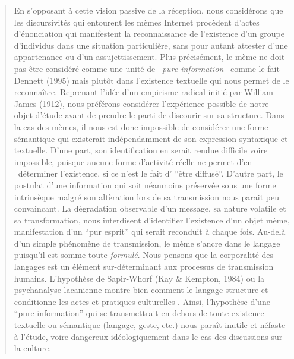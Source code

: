 \begin{quote}
En s{\textquoteright}opposant \`a cette vision passive de la r\'eception, nous consid\'erons que les discursivit\'es qui entourent les m\`emes Internet proc\`edent d{\textquoteright}actes d{\textquoteright}\'enonciation qui manifestent la reconnaissance de l{\textquoteright}existence d{\textquoteright}un groupe d{\textquoteright}individus dans une situation particuli\`ere, sans pour autant attester d{\textquoteright}une appartenance ou d{\textquoteright}un assujettissement. Plus pr\'ecis\'ement, le m\`eme ne doit pas \^etre consid\'er\'e comme une unit\'e de {\guillemotleft}~\textit{pure information~{\guillemotright}} comme le fait Dennett (1995) mais plut\^ot dans l{\textquoteright}existence textuelle qui nous permet de le reconna\^itre. Reprenant l{\textquoteright}id\'ee d{\textquoteright}un empirisme radical initi\'e par William James (1912), nous pr\'ef\'erons consid\'erer l'exp\'erience possible de notre objet d{\textquoteright}\'etude avant de prendre le parti de discourir sur sa structure. Dans la cas des m\`emes, il nous est donc impossible de consid\'erer une forme s\'emantique qui existerait ind\'ependamment de son expression syntaxique et textuelle. D{\textquoteright}une part, son identification en serait rendue difficile voire impossible, puisque aucune forme d{\textquoteright}activit\'e r\'eelle ne permet d{\textquoteright}en \ d\'eterminer l{\textquoteright}existence, si ce n{\textquoteright}est le fait d{\textquoteright} {\textquotedblright}\^etre diffus\'e{\textquotedblright}. D{\textquoteright}autre part, le postulat d{\textquoteright}une information qui soit n\'eanmoins pr\'eserv\'ee sous une forme intrins\`eque malgr\'e son alt\`eration lors de sa transmission nous parait peu convaincant. La d\'egradation observable d{\textquoteright}un message, sa nature volatile et sa transformation, nous interdisent d{\textquoteright}identifier l{\textquoteright}existence d{\textquoteright}un objet m\`eme, manifestation d{\textquoteright}un {\textquotedblleft}pur esprit{\textquotedblright} qui serait reconduit \`a chaque fois. Au-del\`a d{\textquoteright}un simple ph\'enom\`ene de transmission, le m\`eme s{\textquoteright}ancre dans le langage puisqu{\textquoteright}il est somme toute \textit{formul\'e}. Nous pensons que la corporalit\'e des langages est un \'el\'ement sur-d\'eterminant aux processus de transmission humains. L{\textquoteright}hypoth\`ese de Sapir-Whorf (Kay \& Kempton, 1984) ou la psychanalyse lacanienne montre bien comment le langage structure et conditionne les actes et pratiques culturelles \cite{Lacan1966}. Ainsi, l{\textquoteright}hypoth\`ese d{\textquoteright}une {\textquotedblleft}pure information{\textquotedblright} qui se transmettrait en dehors de toute existence textuelle ou s\'emantique (langage, geste, etc.) nous para\^it inutile et n\'efaste \`a l{\textquoteright}\'etude, voire dangereux id\'eologiquement dans le cas des discussions sur la culture.  

\end{quote}

